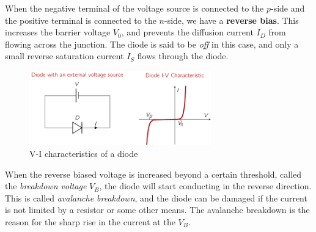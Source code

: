 When the negative terminal of the voltage source is connected to the $p$-side and the positive terminal is connected to the $n$-side, we have a \textbf{reverse bias}. This increases the barrier voltage $V_0$, and prevents the diffusion current $I_D$ from flowing across the junction. The diode is said to be \textit{off} in this case, and only a small reverse saturation current $I_S$ flows through the diode.
\begin{figure}[t]
    \centering
    \includegraphics[width=0.7\textwidth]{figures/ch03/fig03-03.pdf}
    \caption{V-I characteristics of a diode}
    \label{fig:03-diode-vi}
\end{figure}
When the reverse biased voltage is increased beyond a certain threshold, called the \textit{breakdown voltage} $V_B$, the diode will start conducting in the reverse direction. This is called \textit{avalanche breakdown}, and the diode can be damaged if the current is not limited by a resistor or some other means. The avalanche breakdown is the reason for the sharp rise in the current at the $V_B$.

